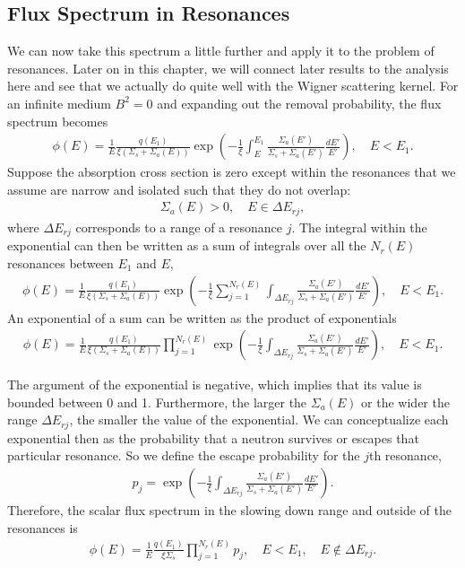 \subsection{Flux Spectrum in Resonances}

We can now take this spectrum a little further and apply it to the problem of resonances. Later on in this chapter, we will connect later results to the analysis here and see that we actually do quite well with the Wigner scattering kernel. For an infinite medium $B^2 = 0$ and expanding out the removal probability, the flux spectrum becomes
\begin{align}
  \phi(E) = \frac{1}{E} \frac{ q(E_1) }{ \xi ( \Sigma_s + \Sigma_a(E)  )} \exp\left( -\frac{1}{\xi} \int_E^{E_1} \frac{ \Sigma_a(E') }{ \Sigma_s + \Sigma_a(E') } \frac{dE'}{E'}  \right) , \quad E < E_1 . 
\end{align}
Suppose the absorption cross section is zero except within the resonances that we assume are narrow and isolated such that they do not overlap:
\begin{align}
  \Sigma_a(E) > 0 , \quad E \in \Delta E_{rj},
\end{align}
where $\Delta E_{rj}$ corresponds to a range of a resonance $j$. The integral within the exponential can then be written as a sum of integrals over all the $N_r(E)$ resonances between $E_1$ and $E$,
\begin{align}
  \phi(E) = \frac{1}{E} \frac{ q(E_1) }{ \xi ( \Sigma_s + \Sigma_a(E)  )} \exp\left( -\frac{1}{\xi} \sum_{j=1}^{N_r(E)} \int_{\Delta E_{rj}} \frac{ \Sigma_a(E') }{ \Sigma_s + \Sigma_a(E') } \frac{dE'}{E'}  \right) , \quad E < E_1 .
\end{align}
An exponential of a sum can be written as the product of exponentials
\begin{align}
  \phi(E) = \frac{1}{E} \frac{ q(E_1) }{ \xi ( \Sigma_s + \Sigma_a(E)  )} \prod_{j=1}^{N_r(E)} \exp\left( -\frac{1}{\xi} \int_{\Delta E_{rj}} \frac{ \Sigma_a(E') }{ \Sigma_s + \Sigma_a(E') } \frac{dE'}{E'}  \right) , \quad E < E_1 . \label{Eq:thermalization_fluxSpectrumWigner}
\end{align}

The argument of the exponential is negative, which implies that its value is bounded between 0 and 1. Furthermore, the larger the $\Sigma_a(E)$ or the wider the range $\Delta E_{rj}$, the smaller the value of the exponential. We can conceptualize each exponential then as the probability that a neutron survives or escapes that particular resonance. So we define the escape probability for the $j$th resonance,
\begin{align}
  p_j = \exp\left( -\frac{1}{\xi} \int_{\Delta E_{rj}} \frac{ \Sigma_a(E') }{ \Sigma_s + \Sigma_a(E') } \frac{dE'}{E'}  \right) .
\end{align}
Therefore, the scalar flux spectrum in the slowing down range and outside of the resonances is
\begin{align}
  \phi(E) = \frac{1}{E} \frac{ q(E_1) }{ \xi \Sigma_s } \prod_{j=1}^{N_r(E)} p_j , \quad E < E_1 , \quad E \notin \Delta E_{rj}. \label{Eq:thermalization_fluxSpectrumWigner_outsideResonances}
\end{align}

